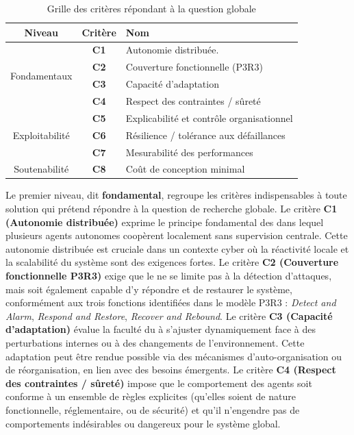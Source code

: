 \begin{table}[H]
    \centering
    \caption{Grille des critères répondant à la question globale}
    \label{tab:critere_hierarchie}
    \small
    \renewcommand{\arraystretch}{1.12}
    \begin{tabular}{ccp{5cm}}
        \hline
        \textbf{Niveau} & \textbf{Critère} & \textbf{Nom}                              \\
        \hline
        \multirow{4}{*}{Fondamentaux}
                        & \textbf{C1}      & Autonomie distribuée.                     \\
                        & \textbf{C2}      & Couverture fonctionnelle (P3R3)           \\
                        & \textbf{C3}      & Capacité d’adaptation                     \\
                        & \textbf{C4}      & Respect des contraintes / sûreté          \\
        \hline
        \multirow{3}{*}{Exploitabilité}
                        & \textbf{C5}      & Explicabilité et contrôle organisationnel \\
                        & \textbf{C6}      & Résilience / tolérance aux défaillances   \\
                        & \textbf{C7}      & Mesurabilité des performances             \\
        \hline
        Soutenabilité
                        & \textbf{C8}      & Coût de conception minimal                \\
        \hline
    \end{tabular}
\end{table}

\noindent
Le premier niveau, dit \textbf{fondamental}, regroupe les critères indispensables à toute solution qui prétend répondre à la question de recherche globale. Le critère \textbf{C1 (Autonomie distribuée)} exprime le principe fondamental des  dans lequel plusieurs agents autonomes coopèrent localement sans supervision centrale. Cette autonomie distribuée est cruciale dans un contexte cyber où la réactivité locale et la scalabilité du système sont des exigences fortes. Le critère \textbf{C2 (Couverture fonctionnelle P3R3)} exige que le  ne se limite pas à la détection d’attaques, mais soit également capable d'y répondre et de restaurer le système, conformément aux trois fonctions identifiées dans le modèle P3R3 : \textit{Detect and Alarm}, \textit{Respond and Restore}, \textit{Recover and Rebound}. Le critère \textbf{C3 (Capacité d’adaptation)} évalue la faculté du  à s’ajuster dynamiquement face à des perturbations internes ou à des changements de l’environnement. Cette adaptation peut être rendue possible via des mécanismes d’auto-organisation ou de réorganisation, en lien avec des besoins émergents. Le critère \textbf{C4 (Respect des contraintes / sûreté)} impose que le comportement des agents soit conforme à un ensemble de règles explicites (qu’elles soient de nature fonctionnelle, réglementaire, ou de sécurité) et qu’il n’engendre pas de comportements indésirables ou dangereux pour le système global.

